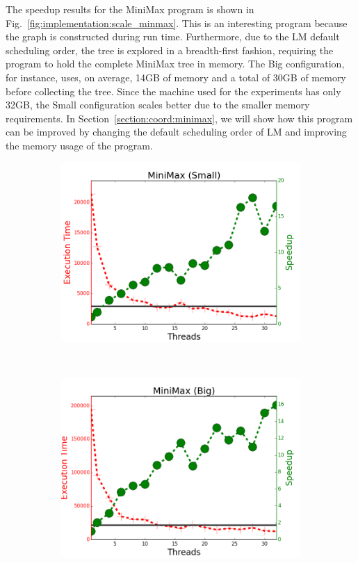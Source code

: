 The speedup results for the MiniMax program is shown in
Fig.~\ref{fig:implementation:scale_minmax}.  This is an interesting program
because the graph is constructed during run time. Furthermore, due to the LM
default scheduling order, the tree is explored in a breadth-first fashion,
requiring the program to hold the complete MiniMax tree in memory. The Big
configuration, for instance, uses, on average, 14GB of memory and a total of
30GB of memory before collecting the tree. Since the machine used for the
experiments has only 32GB, the Small configuration scales better due to the
smaller memory requirements. In Section~\ref{section:coord:minimax}, we will
show how this program can be improved by changing the default scheduling order
of LM and improving the memory usage of the program.

\begin{figure}[]
        \begin{subfigure}[b]{\plotsize\textwidth}
                \includegraphics[width=\textwidth]{experiments/scalability/scale-min-max-tictactoe-small.png}
                \label{fig:implementation:scale_minmax_small}
        \end{subfigure}
        ~
        \begin{subfigure}[b]{\plotsize\textwidth}
                \includegraphics[width=\textwidth]{experiments/scalability/scale-min-max-tictactoe-big.png}

\end{subfigure}
\end{figure}
